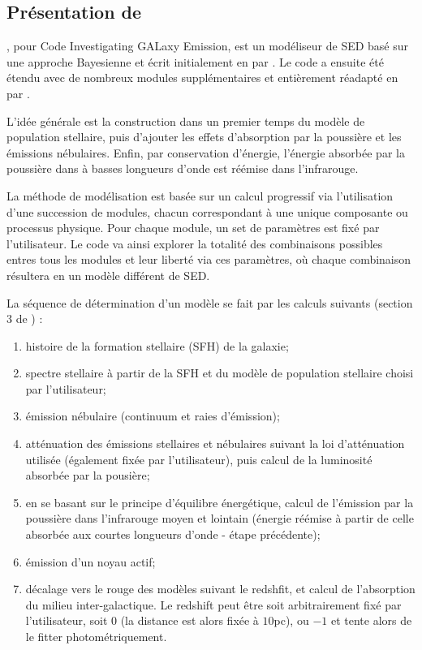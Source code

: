 \documentclass[../main/main.tex]{subfiles}
\begin{document}
\subsection{Présentation de }
\label{ssec:cigale}

, pour Code Investigating GALaxy Emission, est un modéliseur
de SED basé sur une approche Bayesienne et écrit initialement en  par \citet{Burgarella2005,Noll2009}. 
Le code a ensuite été étendu avec de nombreux modules
supplémentaires et
entièrement réadapté en  par \citet{Boquien2019}. 

L'idée générale est la construction dans un premier temps du modèle de
population stellaire, puis d'ajouter les effets d'absorption par la
poussière et les émissions nébulaires. Enfin, par conservation
d'énergie, l'énergie absorbée par la poussière dans à basses longueurs
d'onde est réémise dans l'infrarouge.

La méthode de modélisation est basée sur un calcul progressif via
l'utilisation d'une succession de modules,
chacun correspondant à une unique composante ou processus physique. Pour
chaque module, un set de paramètres est fixé par l'utilisateur. Le code
va ainsi explorer la totalité des combinaisons possibles entres
tous les modules et leur liberté via ces paramètres, où chaque
combinaison résultera en un modèle différent de SED.

La séquence de détermination d'un modèle se fait par les calculs suivants
(section 3 de \citet{Boquien2019}) :

\begin{enumerate}
\item histoire de la formation stellaire (SFH) de la galaxie;
\item spectre stellaire à partir de la SFH et du modèle de
  population stellaire choisi par l'utilisateur;
\item émission nébulaire (continuum et raies d'émission);
\item atténuation des émissions stellaires et nébulaires suivant la
    loi d'atténuation utilisée (également fixée par l'utilisateur), puis
    calcul de la luminosité absorbée par la pousière;
\item en se basant sur le principe d'équilibre énergétique, calcul de
    l'émission par la poussière dans l'infrarouge  moyen et lointain
    (énergie réémise à partir de celle absorbée aux courtes
    longueurs d'onde - étape précédente);
\item émission d'un noyau actif;
\item décalage vers le rouge des modèles suivant le redshfit, et calcul de l'absorption du
      milieu inter-galactique. Le redshift peut être soit  arbitrairement fixé
      par l'utilisateur, soit $0$ (la distance est alors fixée à
      $10$pc), ou $-1$ et  tente alors de le fitter photométriquement.
  
\end{enumerate}
\end{document}
